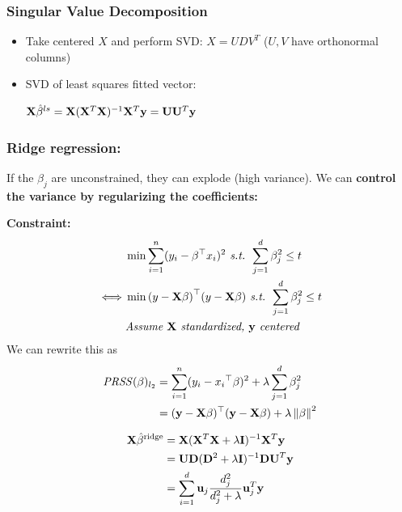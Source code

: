 \subsubsection{Singular Value Decomposition}
\begin{itemize}
	\item Take centered $X$ and perform SVD: $X = UDV^T$ ($U, V$ have orthonormal columns)
	\item SVD of least squares fitted vector: 
	
	$\mathbf X\hat\beta^{ls} = \mathbf X(\mathbf X^T\mathbf X)^{-1}\mathbf X^T\mathbf y = \mathbf U \mathbf U^T\mathbf y$
\end{itemize}

\subsubsection{Ridge regression: }
If the $\beta_j$ are unconstrained, they can explode (high variance). We can \textbf{control the variance by regularizing the coefficients: }

\vspace{1em}
\textbf{Constraint: }
\begin{align*}
	&\min \sum_{i = 1}^{n}(y_i - {\beta}^\top x_i)^2 \textit{ s.t. } \sum_{j = 1}^{d} \beta_j^2 \leq t \\
	\iff &\min {(y- \mathbf X\beta)}^\top(y-\mathbf X\beta)  \textit{ s.t. } \sum_{j = 1}^{d} \beta_j^2 \leq t \\
	&\textit{Assume $\mathbf X$ standardized, $\mathbf y$  centered}
\end{align*}
We can rewrite this as
\begin{align*}
	\mathit{PRSS}(\beta)_{l_2} 	&= \sum_{i = 1}^{n}(y_i - {x_i}^\top\beta)^2 + \lambda\sum_{j = 1}^{d} \beta_j^2 \\
								&= (\mathbf y - \mathbf X\beta)^\top(\mathbf y - \mathbf X\beta) + \lambda\left\lVert\beta\right\rVert^2
\end{align*}

\begin{align*}
	\mathbf X\hat\beta^{\text{ridge}} &= \mathbf X(\mathbf X^T\mathbf X + \lambda\mathbf I)^{-1}\mathbf X^T\mathbf y \\
	&= \mathbf{UD} (\mathbf D^2 + \lambda \mathbf I)^{-1}\mathbf{DU}^T\mathbf y \\
	&= \sum_{i = 1}^{d} \mathbf u_j  \frac{d_{j}^2}{d_{j}^2 + \lambda} \mathbf u_{j}^T\mathbf y 
\end{align*}



